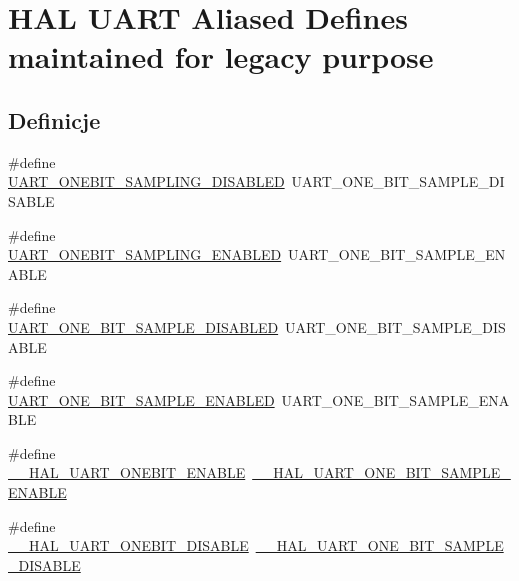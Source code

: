 \hypertarget{group___h_a_l___u_a_r_t___aliased___defines}{}\section{H\+AL U\+A\+RT Aliased Defines maintained for legacy purpose}
\label{group___h_a_l___u_a_r_t___aliased___defines}
\subsection*{Definicje}
\begin{DoxyCompactItemize}
\item 
\#define \hyperlink{group___h_a_l___u_a_r_t___aliased___defines_gab24a7dd52e7b30408662b4d8abc23201}{U\+A\+R\+T\+\_\+\+O\+N\+E\+B\+I\+T\+\_\+\+S\+A\+M\+P\+L\+I\+N\+G\+\_\+\+D\+I\+S\+A\+B\+L\+ED}~U\+A\+R\+T\+\_\+\+O\+N\+E\+\_\+\+B\+I\+T\+\_\+\+S\+A\+M\+P\+L\+E\+\_\+\+D\+I\+S\+A\+B\+LE
\item 
\#define \hyperlink{group___h_a_l___u_a_r_t___aliased___defines_gaee55ba79523b89ea4e6c18d7d45e310f}{U\+A\+R\+T\+\_\+\+O\+N\+E\+B\+I\+T\+\_\+\+S\+A\+M\+P\+L\+I\+N\+G\+\_\+\+E\+N\+A\+B\+L\+ED}~U\+A\+R\+T\+\_\+\+O\+N\+E\+\_\+\+B\+I\+T\+\_\+\+S\+A\+M\+P\+L\+E\+\_\+\+E\+N\+A\+B\+LE
\item 
\#define \hyperlink{group___h_a_l___u_a_r_t___aliased___defines_gac3fb87f174fb4383fbc5f85e6cf2ff9f}{U\+A\+R\+T\+\_\+\+O\+N\+E\+\_\+\+B\+I\+T\+\_\+\+S\+A\+M\+P\+L\+E\+\_\+\+D\+I\+S\+A\+B\+L\+ED}~U\+A\+R\+T\+\_\+\+O\+N\+E\+\_\+\+B\+I\+T\+\_\+\+S\+A\+M\+P\+L\+E\+\_\+\+D\+I\+S\+A\+B\+LE
\item 
\#define \hyperlink{group___h_a_l___u_a_r_t___aliased___defines_ga8ec1cb725dbf11a16e71c489fbe525bc}{U\+A\+R\+T\+\_\+\+O\+N\+E\+\_\+\+B\+I\+T\+\_\+\+S\+A\+M\+P\+L\+E\+\_\+\+E\+N\+A\+B\+L\+ED}~U\+A\+R\+T\+\_\+\+O\+N\+E\+\_\+\+B\+I\+T\+\_\+\+S\+A\+M\+P\+L\+E\+\_\+\+E\+N\+A\+B\+LE
\item 
\#define \hyperlink{group___h_a_l___u_a_r_t___aliased___defines_gaf1ec2145d7a73ee2f74ec334c8210092}{\+\_\+\+\_\+\+H\+A\+L\+\_\+\+U\+A\+R\+T\+\_\+\+O\+N\+E\+B\+I\+T\+\_\+\+E\+N\+A\+B\+LE}~\hyperlink{group___u_a_r_t___exported___macros_ga3524747e5896296ab066d786431503ce}{\+\_\+\+\_\+\+H\+A\+L\+\_\+\+U\+A\+R\+T\+\_\+\+O\+N\+E\+\_\+\+B\+I\+T\+\_\+\+S\+A\+M\+P\+L\+E\+\_\+\+E\+N\+A\+B\+LE}
\item 
\#define \hyperlink{group___h_a_l___u_a_r_t___aliased___defines_ga93fcc521745111012558544b198be1ce}{\+\_\+\+\_\+\+H\+A\+L\+\_\+\+U\+A\+R\+T\+\_\+\+O\+N\+E\+B\+I\+T\+\_\+\+D\+I\+S\+A\+B\+LE}~\hyperlink{group___u_a_r_t___exported___macros_ga2dbd7e6592e8c5999f817b69f0fd24bb}{\+\_\+\+\_\+\+H\+A\+L\+\_\+\+U\+A\+R\+T\+\_\+\+O\+N\+E\+\_\+\+B\+I\+T\+\_\+\+S\+A\+M\+P\+L\+E\+\_\+\+D\+I\+S\+A\+B\+LE}

\end{DoxyCompactItemize}
